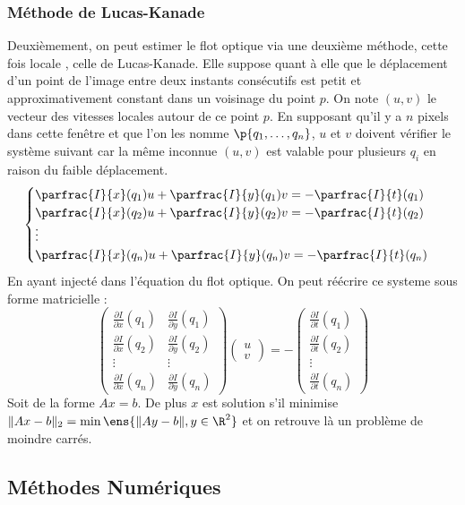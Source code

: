 \documentclass{magnolia}
\begin{document}
\subsubsection{Méthode de Lucas-Kanade}
Deuxièmement, on peut estimer le flot optique via une deuxième méthode, cette fois locale \cite{lucas}, celle de Lucas-Kanade. Elle suppose quant à elle que le déplacement d'un point de l'image entre deux instants consécutifs est petit et approximativement constant dans un voisinage du point $p$. On note $(u,v)$ le vecteur des vitesses locales autour de ce point $p$. En supposant qu'il y a $n$ pixels dans cette fenêtre et que l'on les nomme $\p{q_1,\dots,q_n}$, $u$ et $v$ doivent vérifier le système suivant car la même inconnue $(u,v)$ est valable pour plusieurs $q_i$ en raison du faible déplacement.
\[
\begin{cases}
\parfrac{I}{x}(q_1)u + \parfrac{I}{y}(q_1)v = -\parfrac{I}{t}(q_1) \\
\parfrac{I}{x}(q_2)u + \parfrac{I}{y}(q_2)v = -\parfrac{I}{t}(q_2) \\
\vdots \\
\parfrac{I}{x}(q_n)u + \parfrac{I}{y}(q_n)v = -\parfrac{I}{t}(q_n)
\end{cases}
\]
En ayant injecté dans l'équation du flot optique. On peut réécrire ce systeme sous forme matricielle : 
\[
\begin{pmatrix}
\frac{\partial I}{\partial x}(q_1) & \frac{\partial I}{\partial y}(q_1) \\
\frac{\partial I}{\partial x}(q_2) & \frac{\partial I}{\partial y}(q_2) \\
\vdots & \vdots \\
\frac{\partial I}{\partial x}(q_n) & \frac{\partial I}{\partial y}(q_n)
\end{pmatrix}
\begin{pmatrix}
u \\
v
\end{pmatrix}
=
-
\begin{pmatrix}
\frac{\partial I}{\partial t}(q_1) \\
\frac{\partial I}{\partial t}(q_2) \\
\vdots \\
\frac{\partial I}{\partial t}(q_n)
\end{pmatrix}
\]
Soit de la forme $Ax=b$. De plus $x$ est solution s'il minimise $\|Ax-b \|_2 = \min\ens{ \|Ay-b\|, y\in\R^2}$ et on retrouve là un problème de moindre carrés.


\subsection{Méthodes Numériques}
\end{document}
